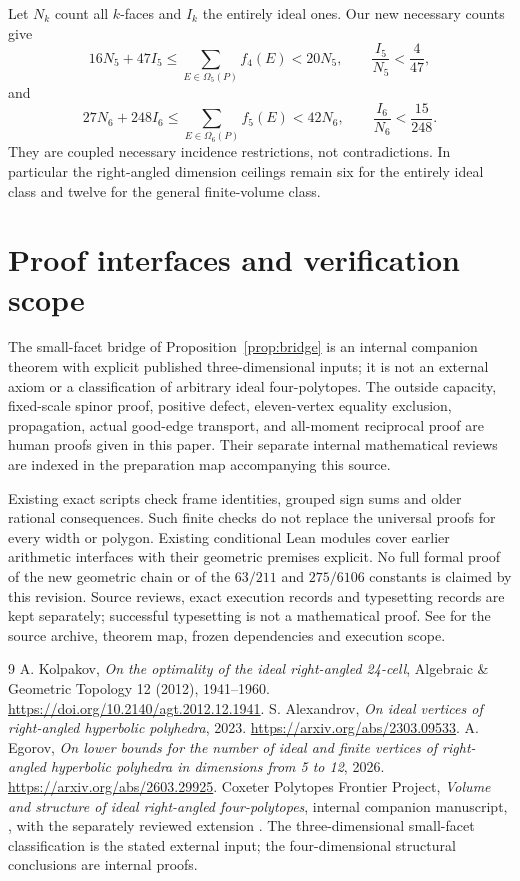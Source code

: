 \documentclass[11pt]{article}
\theoremstyle{remark}
\begin{document}
Let $N_k$ count all $k$-faces and $I_k$ the entirely ideal ones. Our
new necessary counts give
\[
 16N_5+47I_5\le\sum_{E\in\Omega_5(P)}f_4(E)<20N_5,
 \qquad \frac{I_5}{N_5}<\frac4{47},
\]
and
\[
 27N_6+248I_6\le\sum_{E\in\Omega_6(P)}f_5(E)<42N_6,
 \qquad \frac{I_6}{N_6}<\frac{15}{248}.
\]
They are coupled necessary incidence restrictions, not contradictions.
In particular the right-angled dimension ceilings remain six for the
entirely ideal class and twelve for the general finite-volume class.

\section{Proof interfaces and verification scope}\label{sec:verification}

The small-facet bridge of Proposition~\ref{prop:bridge} is an internal
companion theorem with explicit published three-dimensional inputs;
it is not an external axiom or a classification of arbitrary ideal
four-polytopes. The outside capacity, fixed-scale spinor proof,
positive defect, eleven-vertex equality exclusion, propagation, actual
good-edge transport, and all-moment reciprocal proof are human proofs
given in this paper. Their separate internal mathematical reviews are
indexed in the preparation map accompanying this source.

Existing exact scripts check frame identities, grouped sign sums and
older rational consequences. Such finite checks do not replace the
universal proofs for every width or polygon. Existing conditional Lean
modules cover earlier arithmetic interfaces with their geometric
premises explicit. No full formal proof of the new geometric chain or
of the $63/211$ and $275/6106$ constants is claimed by this revision.
Source reviews, exact execution records and typesetting records are kept
separately; successful typesetting is not a mathematical proof.
See 
for the source archive, theorem map, frozen dependencies and execution scope.

\begin{thebibliography}{9}
 A. Kolpakov, \emph{On the optimality of the ideal right-angled
24-cell}, Algebraic \& Geometric Topology 12 (2012), 1941--1960.
\url{https://doi.org/10.2140/agt.2012.12.1941}.
 S. Alexandrov, \emph{On ideal vertices of right-angled
hyperbolic polyhedra}, 2023. \url{https://arxiv.org/abs/2303.09533}.
 A. Egorov, \emph{On lower bounds for the number of ideal
and finite vertices of right-angled hyperbolic polyhedra in dimensions
from 5 to 12}, 2026. \url{https://arxiv.org/abs/2603.29925}.
 Coxeter Polytopes Frontier Project,
\emph{Volume and structure of ideal right-angled four-polytopes},
internal companion manuscript, ,
with the separately reviewed extension
.
The three-dimensional small-facet classification is the stated external
input; the four-dimensional structural conclusions are internal proofs.
\end{thebibliography}
\end{document}
